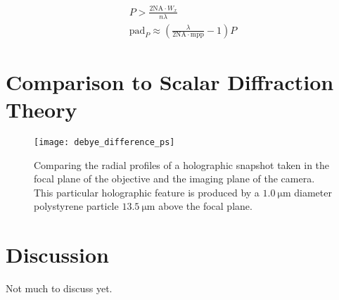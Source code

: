   \begin{equation*}
    \begin{split}
      P > \frac{2 \text{NA}\cdot W_x}{n\lambda} \\
      \text{pad}_P  \approx  \left ( \frac{\lambda}{2\text{NA}\cdot\text{mpp}} - 1 \right )P
    \end{split}
  \end{equation*}


  
\section{Comparison to Scalar Diffraction Theory}


\begin{figure}
  \centering
  \texttt{[image: debye\_difference\_ps]}
  \caption{Comparing the radial profiles of a holographic snapshot taken
    in the focal plane of the objective and the imaging plane of the camera.
    This particular holographic feature is produced by a $\SI{1.0}{\um}$
    diameter polystyrene particle $\SI{13.5}{\um}$ above the focal plane.}
  \label{fig:debye_difference_ps}
\end{figure}


\section{Discussion}

Not much to discuss yet.


